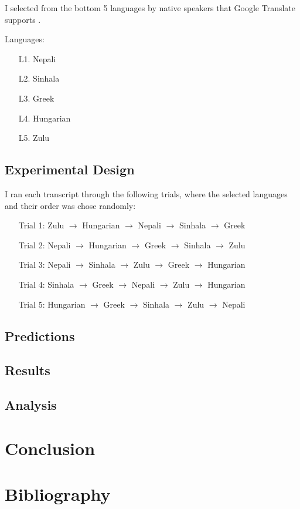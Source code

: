 \documentclass{article}
\begin{document}
I selected from the bottom 5 languages by native speakers that Google Translate supports .




\vspace{1em} \noindent
Languages:
\begin{enumerate}
  \item[L1.] Nepali
  \item[L2.] Sinhala
  \item[L3.] Greek
  \item[L4.] Hungarian
  \item[L5.] Zulu
\end{enumerate}

\subsection{Experimental Design}


I ran each transcript through the following trials, where the selected languages and their order was chose randomly:




\begin{enumerate}
  \item[] Trial 1: Zulu $\rightarrow$ Hungarian $\rightarrow$ Nepali $\rightarrow$ Sinhala $\rightarrow$ Greek
  \item[] Trial 2: Nepali $\rightarrow$ Hungarian $\rightarrow$ Greek $\rightarrow$ Sinhala $\rightarrow$ Zulu
  \item[] Trial 3: Nepali $\rightarrow$ Sinhala $\rightarrow$ Zulu $\rightarrow$ Greek $\rightarrow$ Hungarian
  \item[] Trial 4: Sinhala $\rightarrow$ Greek $\rightarrow$ Nepali $\rightarrow$ Zulu $\rightarrow$ Hungarian
  \item[] Trial 5: Hungarian $\rightarrow$ Greek $\rightarrow$ Sinhala $\rightarrow$ Zulu $\rightarrow$ Nepali
\end{enumerate}

\subsection{Predictions}\subsection{Results}\subsection{Analysis}\section{Conclusion}



\section*{Bibliography}
\end{document}
